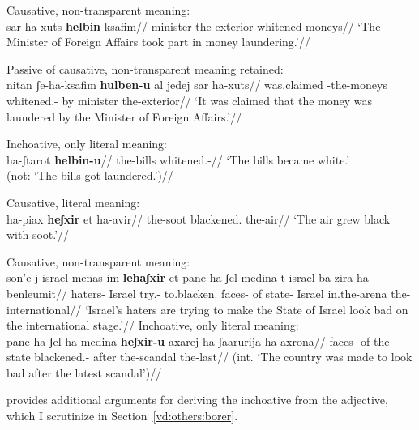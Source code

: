 	\a Causative, non-transparent meaning:\\
		\begingl
			\gla sar ha-xuts \textbf{helbin} ksafim//
			\glb minister the-exterior whitened moneys//
			\glft `The Minister of Foreign Affairs took part in money laundering.'//
		\endgl
	
	\a Passive of causative, non-transparent meaning retained:\\
		\begingl
			\gla nitan ʃe-ha-ksafim \textbf{hulben-u} {al jedej} sar ha-xuts//
			\glb was.claimed -the-moneys whitened.- by minister the-exterior//
			\glft `It was claimed that the money was laundered by the Minister of Foreign Affairs.'//
		\endgl
	
	\a Inchoative, only literal meaning:\\
		\begingl
			\gla ha-ʃtarot \textbf{helbin-u}//
			\glb the-bills whitened.-//
			\glft `The bills became white.'\\
				(not: `The bills got laundered.')//
		\endgl
\xe

\pex
	\a Causative, literal meaning:\\
		\begingl
			\gla ha-piax \textbf{heʃxir} et ha-avir//
			\glb the-soot blackened.  the-air//
			\glft `The air grew black with soot.'//
		\endgl
	
	\a Causative, non-transparent meaning:\\
		\begingl
			\gla son'e-j israel menas-im \textbf{lehaʃxir} et pane-ha ʃel medina-t israel ba-zira ha-benleumit//
			\glb haters- Israel try.- to.blacken.  faces- of state- Israel in.the-arena the-international//
			\glft `Israel's haters are trying to make the State of Israel look bad on the international stage.'//
		\endgl
	\a Inchoative, only literal meaning:\\
		\begingl
			\gla{}pane-ha ʃel ha-medina \textbf{heʃxir-u} axarej ha-ʃaarurija ha-axrona//
			\glb faces- of the-state blackened.- after the-scandal the-last//
			\glft (int. `The country was made to look bad after the latest scandal')//
		\endgl
\xe


\cite{borer91} provides additional arguments for deriving the inchoative from the adjective, which I scrutinize in Section~\ref{vd:others:borer}.

